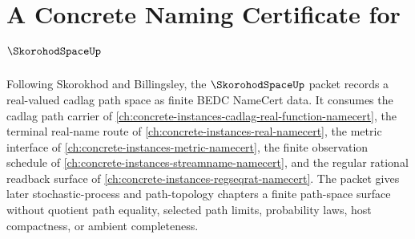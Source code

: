\chapter{A Concrete Naming Certificate for $\SkorohodSpaceUp$}
\label{ch:concrete-instances-skorohod-space-namecert}

Following Skorokhod and Billingsley, the $\SkorohodSpaceUp$ packet records a real-valued cadlag path space as finite BEDC NameCert data. It consumes the cadlag path carrier of \autoref{ch:concrete-instances-cadlag-real-function-namecert}, the terminal real-name route of \autoref{ch:concrete-instances-real-namecert}, the metric interface of \autoref{ch:concrete-instances-metric-namecert}, the finite observation schedule of \autoref{ch:concrete-instances-streamname-namecert}, and the regular rational readback surface of \autoref{ch:concrete-instances-regseqrat-namecert}. The packet gives later stochastic-process and path-topology chapters a finite path-space surface without quotient path equality, selected path limits, probability laws, host compactness, or ambient completeness.

